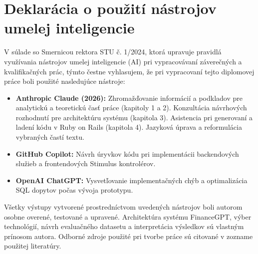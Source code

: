 \cleardoublepage
{}
{}
\section*{Deklarácia o použití nástrojov umelej inteligencie}

V súlade so Smernicou rektora STU č. 1/2024, ktorá upravuje pravidlá využívania nástrojov umelej inteligencie (AI) pri vypracovávaní záverečných a kvalifikačných prác, týmto čestne vyhlasujem, že pri vypracovaní tejto diplomovej práce boli použité nasledujúce nástroje:

\begin{itemize}
    \item \textbf{Anthropic Claude (2026):} Zhromažďovanie informácií a podkladov pre analytickú a teoretickú časť práce (kapitoly 1 a 2). Konzultácia návrhových rozhodnutí pre architektúru systému (kapitola 3). Asistencia pri generovaní a ladení kódu v Ruby on Rails (kapitola 4). Jazyková úprava a reformulácia vybraných častí textu.
    \item \textbf{GitHub Copilot:} Návrh úryvkov kódu pri implementácii backendových služieb a frontendových Stimulus kontrolérov.
    \item \textbf{OpenAI ChatGPT:} Vysvetľovanie implementačných chýb a optimalizácia SQL dopytov počas vývoja prototypu.
\end{itemize}

Všetky výstupy vytvorené prostredníctvom uvedených nástrojov boli autorom osobne overené, testované a upravené. Architektúra systému FinanceGPT, výber technológií, návrh evaluačného datasetu a interpretácia výsledkov sú vlastným prínosom autora. Odborné zdroje použité pri tvorbe práce sú citované v zozname použitej literatúry.
